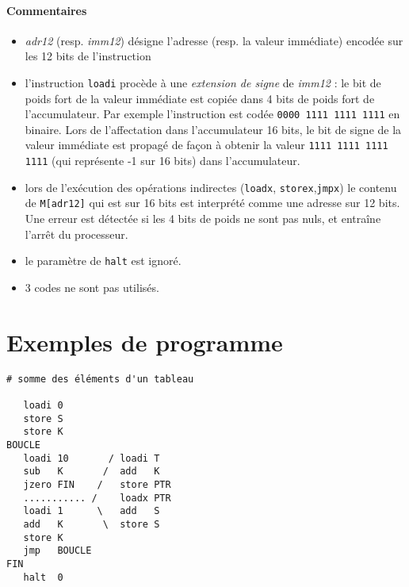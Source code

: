\documentclass[11pt]{article}
\begin{document}
\paragraph{Commentaires}
\begin{itemize}
\item \emph{adr12} (resp. \emph{imm12}) désigne l'adresse (resp. la valeur immédiate) encodée sur les 12 bits de l'instruction
\item l'instruction \texttt{loadi} procède à une \emph{extension de
  signe} de \emph{imm12} : le bit de poids fort de la valeur immédiate
  est copiée dans 4 bits de poids fort de l'accumulateur. Par exemple
  l'instruction  est codée \texttt{0000 1111
    1111 1111} en binaire. Lors de l'affectation dans l'accumulateur
  16 bits, le bit de signe de la valeur immédiate est propagé de façon
  à obtenir la valeur \texttt{1111 1111 1111 1111} (qui représente -1
  sur 16 bits) dans l'accumulateur.
\item lors de l'exécution des opérations indirectes 
(\texttt{loadx}, \texttt{storex},\texttt{jmpx})
le contenu de \verb/M[adr12]/  qui est sur 16 bits est interprété
comme une adresse sur 12 bits. Une erreur est détectée si les 4 bits de poids 
ne sont pas nuls, et entraîne l'arrêt du processeur.
\item le paramètre de \texttt{halt} est ignoré.
\item 3 codes ne sont pas utilisés.
\end{itemize}

\newpage

\section{Exemples de programme}




\begin{lstlisting}[frame=single]
# somme des éléments d'un tableau

   loadi 0
   store S
   store K
BOUCLE
   loadi 10       / loadi T
   sub   K       /  add   K
   jzero FIN    /   store PTR
   ........... /    loadx PTR
   loadi 1      \   add   S
   add   K       \  store S
   store K
   jmp   BOUCLE
FIN
   halt  0
\end{lstlisting}
\end{document}
